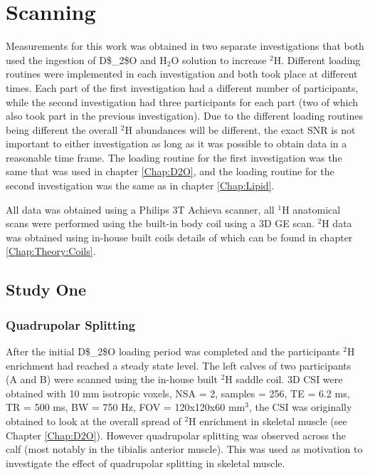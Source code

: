 \section{Scanning}

Measurements for this work was obtained in two separate investigations that both used the ingestion of \ac{D$_2$O} and H$_2$O solution to increase $^2$H. Different loading routines were implemented in each investigation and both took place at different times. Each part of the first investigation had a different number of participants, while the second investigation had three participants for each part (two of which also took part in the previous investigation). Due to the different loading routines being different the overall $^2$H abundances will be different, the exact \ac{SNR} is not important to either investigation as long as it was possible to obtain data in a reasonable time frame. The loading routine for the first investigation was the same that was used in chapter \ref{Chap:D2O}, and the loading routine for the second investigation was the same as in chapter \ref{Chap:Lipid}.

All data was obtained using a Philips 3T Achieva scanner, all $^1$H anatomical scans were performed using the built-in body coil using a 3D \ac{GE} scan. $^2$H data was obtained using in-house built coils details of which can be found in chapter \ref{Chap:Theory:Coils}. 

\subsection{Study One}
\subsubsection{Quadrupolar Splitting}
\label{Chap:Quad:1:Split}

After the initial \ac{D$_2$O} loading period was completed and the participants $^2$H enrichment had reached a steady state level. The left calves of two participants (A and B) were scanned using the in-house built $^2$H saddle coil. 3D \ac{CSI} were obtained with 10 mm isotropic voxels, NSA = 2, samples = 256, \ac{TE} = 6.2 ms, \ac{TR} = 500 ms, \ac{BW} = 750 Hz, FOV = 120x120x60 mm$^3$, the \ac{CSI} was originally obtained to look at the overall spread of $^2$H enrichment in skeletal muscle (see Chapter \ref{Chap:D2O}). However quadrupolar splitting was observed across the calf (most notably in the tibialis anterior muscle). This was used as motivation to investigate the effect of quadrupolar splitting in skeletal muscle.

